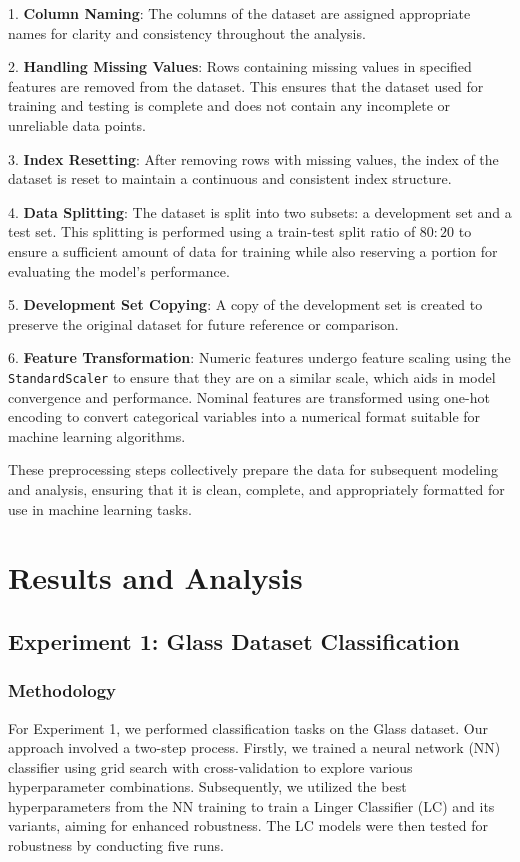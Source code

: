 \documentclass[a4paper, 12pt]{report}
\begin{document}
1. \textbf{Column Naming}: The columns of the dataset are assigned appropriate names for clarity and consistency throughout the analysis.

2. \textbf{Handling Missing Values}: Rows containing missing values in specified features are removed from the dataset. 
This ensures that the dataset used for training and testing is complete and does not contain any incomplete or unreliable data points.

3. \textbf{Index Resetting}: After removing rows with missing values, the index of the dataset is reset to maintain a continuous and consistent index structure.

4. \textbf{Data Splitting}: The dataset is split into two subsets: a development set and a test set. 
This splitting is performed using a train-test split ratio of $80:20$ to ensure a sufficient amount of data for training while also reserving a portion for evaluating the model's performance.

5. \textbf{Development Set Copying}: A copy of the development set is created to preserve the original dataset for future reference or comparison.

6. \textbf{Feature Transformation}: Numeric features undergo feature scaling using the \texttt{StandardScaler} to ensure that they are on a similar scale, 
which aids in model convergence and performance. Nominal features are transformed using one-hot encoding to convert categorical variables into a numerical format 
suitable for machine learning algorithms.

These preprocessing steps collectively prepare the data for subsequent modeling and analysis, ensuring that it is clean, complete, and 
appropriately formatted for use in machine learning tasks.

\section{Results and Analysis}

\subsection{Experiment 1: Glass Dataset Classification}

\subsubsection{Methodology}
For Experiment 1, we performed classification tasks on the Glass dataset. Our approach involved a two-step process. 
Firstly, we trained a neural network (NN) classifier using grid search with cross-validation to explore various hyperparameter combinations. 
Subsequently, we utilized the best hyperparameters from the NN training to train a Linger Classifier (LC) and its variants, aiming for enhanced robustness. 
The LC models were then tested for robustness by conducting five runs.
\end{document}
